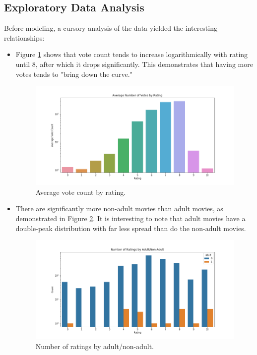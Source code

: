 \documentclass[12pt, oneside]{article}   	%
\begin{document}
\subsection{Exploratory Data Analysis}

Before modeling, a cursory analysis of the data yielded the interesting relationships:

\begin{itemize}

\item Figure \ref{fig:vote_count_by_rating} shows that vote count tends to increase logarithmically with rating until 8, after which it drops significantly. This demonstrates that having more votes tends to "bring down the curve."

\begin{figure}[H]
\includegraphics[width=\textwidth]{vote_count_by_rating}
\caption{\label{fig:vote_count_by_rating}Average vote count by rating.}
\end{figure}

\item There are significantly more non-adult movies than adult movies, as demonstrated in Figure \ref{fig:ratings_by_adult}. It is interesting to note that adult movies have a double-peak distribution with far less spread than do the non-adult movies.

\begin{figure}[H]
\includegraphics[width=\textwidth]{ratings_by_adult}
\caption{\label{fig:ratings_by_adult}Number of ratings by adult/non-adult.}
\end{figure}


\end{itemize}
\end{document}

